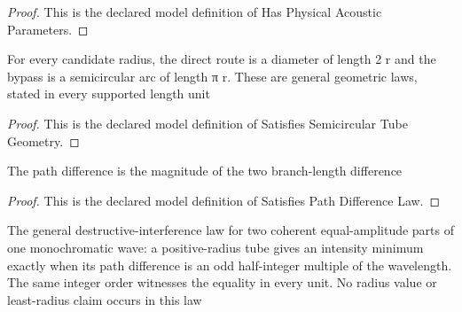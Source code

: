 \begin{proof}
  This is the declared model definition of Has Physical Acoustic Parameters.
\end{proof}
\begin{definition}
  \label{def:physics:phyx-mini-0315:phyxminiproblems-problemphyxmini0315-satisfiessemicirculartubegeometry}
  For every candidate radius, the direct route is a diameter of length 2 r and the bypass is a semicircular arc of length π r. These are general geometric laws, stated in every supported length unit
\end{definition}
\begin{proof}
  This is the declared model definition of Satisfies Semicircular Tube Geometry.
\end{proof}
\begin{definition}
  \label{def:physics:phyx-mini-0315:phyxminiproblems-problemphyxmini0315-satisfiespathdifferencelaw}
  The path difference is the magnitude of the two branch-length difference
\end{definition}
\begin{proof}
  This is the declared model definition of Satisfies Path Difference Law.
\end{proof}
\begin{definition}
  \label{def:physics:phyx-mini-0315:phyxminiproblems-problemphyxmini0315-satisfiestwopathdestructiveinterferencelaw}
  The general destructive-interference law for two coherent equal-amplitude parts of one monochromatic wave: a positive-radius tube gives an intensity minimum exactly when its path difference is an odd half-integer multiple of the wavelength. The same integer order witnesses the equality in every unit. No radius value or least-radius claim occurs in this law
\end{definition}
